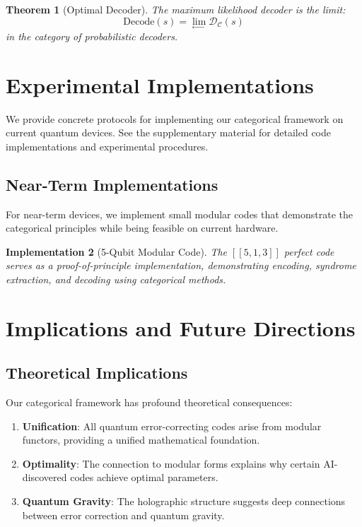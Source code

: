 \documentclass[12pt,a4paper]{article}
\newtheorem{theorem}{Theorem}[section]
\newtheorem{implementation}[theorem]{Implementation}
\begin{document}
\begin{theorem}[Optimal Decoder]
The maximum likelihood decoder is the limit:
\[
\text{Decode}(s) = \lim_{\leftarrow} \mathcal{D}_\mathcal{C}(s)
\]
in the category of probabilistic decoders.
\end{theorem}

\section{Experimental Implementations}

We provide concrete protocols for implementing our categorical framework on current quantum devices. See the supplementary material for detailed code implementations and experimental procedures.

\subsection{Near-Term Implementations}

For near-term devices, we implement small modular codes that demonstrate the categorical principles while being feasible on current hardware.

\begin{implementation}[5-Qubit Modular Code]
The $[[5,1,3]]$ perfect code serves as a proof-of-principle implementation, demonstrating encoding, syndrome extraction, and decoding using categorical methods.
\end{implementation}

\section{Implications and Future Directions}

\subsection{Theoretical Implications}

Our categorical framework has profound theoretical consequences:

\begin{enumerate}
\item \textbf{Unification}: All quantum error-correcting codes arise from modular functors, providing a unified mathematical foundation.
\item \textbf{Optimality}: The connection to modular forms explains why certain AI-discovered codes achieve optimal parameters.
\item \textbf{Quantum Gravity}: The holographic structure suggests deep connections between error correction and quantum gravity.
\end{enumerate}
\end{document}
